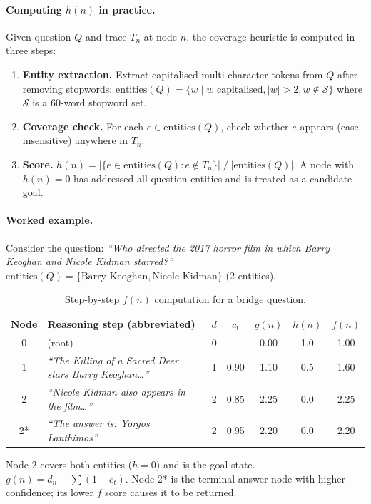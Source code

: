 \documentclass{article}
\begin{document}
\paragraph{Computing $h(n)$ in practice.}
Given question $Q$ and trace $T_n$ at node $n$, the coverage heuristic is computed in three steps:
\begin{enumerate}[leftmargin=*, noitemsep]
  \item \textbf{Entity extraction.} Extract capitalised multi-character tokens from $Q$ after removing stopwords: $\text{entities}(Q) = \{w \mid w \text{ capitalised}, |w|>2, w \notin \mathcal{S}\}$ where $\mathcal{S}$ is a 60-word stopword set.
  \item \textbf{Coverage check.} For each $e \in \text{entities}(Q)$, check whether $e$ appears (case-insensitive) anywhere in $T_n$.
  \item \textbf{Score.} $h(n) = |\{e \in \text{entities}(Q) : e \notin T_n\}| \;/\; |\text{entities}(Q)|$. A node with $h(n)=0$ has addressed all question entities and is treated as a candidate goal.
\end{enumerate}

\paragraph{Worked example.}
Consider the question: \textit{``Who directed the 2017 horror film in which Barry Keoghan and Nicole Kidman starred?''}
$\text{entities}(Q) = \{\text{Barry Keoghan}, \text{Nicole Kidman}\}$ (2 entities).

\begin{table}[h]
\centering
\caption{Step-by-step $f(n)$ computation for a bridge question.}
\label{tab:heuristic_example}
\small
\begin{tabular}{clccccc}
\toprule
Node & Reasoning step (abbreviated) & $d$ & $c_t$ & $g(n)$ & $h(n)$ & $f(n)$ \\
\midrule
0 & (root) & 0 & -- & 0.00 & 1.0 & 1.00 \\
1 & \textit{``The Killing of a Sacred Deer stars Barry Keoghan\ldots''} & 1 & 0.90 & 1.10 & 0.5 & 1.60 \\
2 & \textit{``Nicole Kidman also appears in the film\ldots''} & 2 & 0.85 & 2.25 & 0.0 & 2.25 \\
2* & \textit{``The answer is: Yorgos Lanthimos''} & 2 & 0.95 & 2.20 & 0.0 & 2.20 \\
\bottomrule
\end{tabular}
\end{table}
\vspace{-4pt}
{\footnotesize Node 2 covers both entities ($h=0$) and is the goal state. $g(n) = d_n + \sum(1-c_t)$. Node 2* is the terminal answer node with higher confidence; its lower $f$ score causes it to be returned.}
\end{document}
